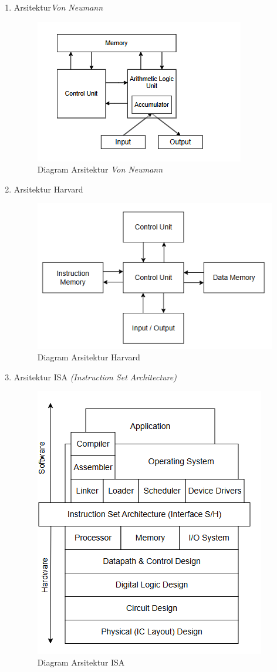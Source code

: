 \documentclass[12pt]{article}
\begin{document}
\begin{enumerate}
    \item Arsitektur\textit{Von Neumann}

        \noindent
        \begin{figure}[H]
            \centering
            \includegraphics[width=0.6\linewidth]{asset/image1.png}
            \caption{Diagram Arsitektur \textit{Von Neumann}}
            \label{fig:Arsitektur-Von-Neumann}
        \end{figure}

    \item Arsitektur Harvard
    
        \noindent
        \begin{figure}[H]
            \centering
            \includegraphics[width=0.6\linewidth]{asset/image2.png}
            \caption{Diagram Arsitektur Harvard}
            \label{fig:Diagram-Arsitektur-Harvard}
        \end{figure}
    
    \item Arsitektur ISA \textit{(Instruction Set Architecture)}

        \noindent
        \begin{figure}[H]
            \centering
            \includegraphics[width=0.3\linewidth]{asset/image3.png}
            \caption{Diagram Arsitektur ISA}
            \label{fig:Diagram-Arsitektur-ISA}
        \end{figure}


\end{enumerate}
\end{document}
